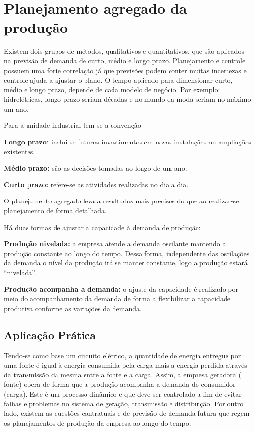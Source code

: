 \chapter{Planejamento agregado da produção}
\label{chap:planejamento_agregado}

Existem dois grupos de métodos, qualitativos e quantitativos, que são aplicados na previsão de demanda de curto, médio e longo prazo.
Planejamento e controle possuem uma forte correlação já que previsões podem conter muitas incertezas e controle ajuda a ajustar o plano.
O tempo aplicado para dimensionar curto, médio e longo prazo, depende de cada modelo de negócio. Por exemplo: hidrelétricas, longo prazo seriam décadas e no mundo da moda seriam no máximo um ano.

Para a unidade industrial tem-se a convenção:

\textbf{Longo prazo:} inclui-se futuros investimentos em novas instalações ou ampliações existentes.

\textbf{Médio prazo:} são as decisões tomadas ao longo de um ano.

\textbf{Curto prazo:} refere-se as atividades realizadas no dia a dia.

O planejamento agregado leva a resultados mais precisos do que ao realizar-se planejamento de forma detalhada.

Há duas formas de ajustar a capacidade à demanda de produção:

\textbf{Produção nivelada:} a empresa atende a demanda oscilante mantendo a produção constante ao longo do tempo. Dessa forma, independente das oscilações da demanda o nível da produção irá se manter constante, logo a produção estará ``nivelada''.

\textbf{Produção acompanha a demanda:} o ajuste da capacidade é realizado por meio do acompanhamento da demanda de forma a flexibilizar a capacidade produtiva conforme as variações da demanda.


\section{Aplicação Prática}
\label{sec:planejamento_agregado_aplicacao}

Tendo-se como base um circuito elétrico, a quantidade de energia entregue por uma fonte é igual à energia consumida pela carga mais a energia perdida através da transmissão da mesma entre a fonte e a carga. Assim, a empresa geradora ( fonte) opera de forma que a produção acompanha a demanda do consumidor (carga). Este é um processo dinâmico e que deve ser controlado a fim de evitar falhas e problemas no sistema de geração, transmissão e distribuição. Por outro lado, existem as questões contratuais e de previsão de demanda futura que regem os planejamentos de produção da empresa ao longo do tempo.

